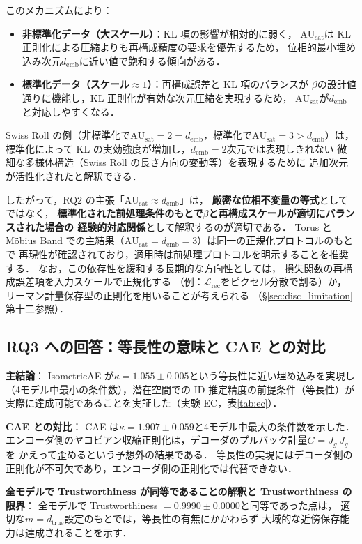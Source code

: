 \documentclass[12pt,a4paper]{jsarticle}
\newcommand{\dtrue}{d_{\mathrm{true}}}
\newcommand{\Jg}{J_g}
\newcommand{\kap}{\kappa}
\newcommand{\AUsat}{\mathrm{AU}_{\mathrm{sat}}}
\newcommand{\demb}{d_{\mathrm{emb}}}
\begin{document}
このメカニズムにより：
\begin{itemize}
  \item \textbf{非標準化データ（大スケール）}：KL 項の影響が相対的に弱く，
        $\AUsat$は KL 正則化による圧縮よりも再構成精度の要求を優先するため，
        位相的最小埋め込み次元$\demb$に近い値で飽和する傾向がある．
  \item \textbf{標準化データ（スケール$\approx 1$）}：再構成誤差と KL 項のバランスが
        $\beta$の設計値通りに機能し，KL 正則化が有効な次元圧縮を実現するため，
        $\AUsat$が$\demb$と対応しやすくなる．
\end{itemize}
Swiss Roll の例（非標準化で$\AUsat = 2 = \demb$，標準化で$\AUsat = 3 > \demb$）は，
標準化によって KL の実効強度が増加し，$\demb = 2$次元では表現しきれない
微細な多様体構造（Swiss Roll の長さ方向の変動等）を表現するために
追加次元が活性化されたと解釈できる．

したがって，RQ2 の主張「$\AUsat \approx \demb$」は，
\textbf{厳密な位相不変量の等式}としてではなく，
\textbf{標準化された前処理条件のもとで$\beta$と再構成スケールが適切にバランスされた場合の
経験的対応関係}として解釈するのが適切である．
Torus と Möbius Band での主結果（$\AUsat = \demb = 3$）は同一の正規化プロトコルのもとで
再現性が確認されており，適用時は前処理プロトコルを明示することを推奨する．
なお，この依存性を緩和する長期的な方向性としては，
損失関数の再構成誤差項を入力スケールで正規化する
（例：$\mathcal{L}_{\mathrm{rec}}$をピクセル分散で割る）か，
リーマン計量保存型の正則化を用いることが考えられる
（§\ref{sec:disc_limitation}第十二参照）．

\subsection{RQ3 への回答：等長性の意味と CAE との対比}\label{sec:disc_rq3}

\textbf{主結論}：
IsometricAE が$\kap = 1.055\pm0.005$という等長性に近い埋め込みを実現し
（4モデル中最小の条件数），潜在空間での ID 推定精度の前提条件（等長性）が
実際に達成可能であることを実証した（実験 EC，表\ref{tab:ec}）．

\textbf{CAE との対比}：
CAE は$\kap = 1.907\pm0.059$と4モデル中最大の条件数を示した．
エンコーダ側のヤコビアン収縮正則化は，デコーダのプルバック計量$G = \Jg^\top\Jg$を
かえって歪めるという予想外の結果である．
等長性の実現にはデコーダ側の正則化が不可欠であり，エンコーダ側の正則化では代替できない．

\textbf{全モデルで Trustworthiness が同等であることの解釈と Trustworthiness の限界}：
全モデルで Trustworthiness $= 0.9990\pm0.0000$と同等であった点は，
適切な$m = \dtrue$設定のもとでは，等長性の有無にかかわらず
大域的な近傍保存能力は達成されることを示す．
\end{document}

